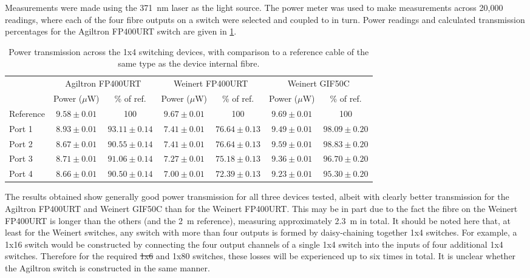 \documentclass[a4paper,11pt]{article}
\providecommand{\DIFaddtex}[1]{{\protect\color{blue}\uwave{#1}}} %
\providecommand{\DIFdeltex}[1]{{\protect\color{red}\sout{#1}}}                      %
\providecommand{\DIFaddbegin}{} %
\providecommand{\DIFaddend}{} %
\providecommand{\DIFdelbegin}{} %
\providecommand{\DIFdelend}{} %
\providecommand{\DIFadd}[1]{\texorpdfstring{\DIFaddtex{#1}}{#1}} %
\providecommand{\DIFdel}[1]{\texorpdfstring{\DIFdeltex{#1}}{}} %
\newcommand{\DIFscaledelfig}{0.5}
\newlength{\DIFdelgraphicswidth} %
\newlength{\DIFdelgraphicsheight} %
\newcommand{\DIFaddincludegraphics}[2][]{{\color{blue}\fbox{\DIFOincludegraphics[#1]{#2}}}} %
\newcommand{\DIFdelincludegraphics}[2][]{%
\sbox{\DIFdelgraphicsbox}{\DIFOincludegraphics[#1]{#2}}%
\settoboxwidth{\DIFdelgraphicswidth}{\DIFdelgraphicsbox} %
\settoboxtotalheight{\DIFdelgraphicsheight}{\DIFdelgraphicsbox} %
\scalebox{\DIFscaledelfig}{%
\parbox[b]{\DIFdelgraphicswidth}{\usebox{\DIFdelgraphicsbox}\\[-\baselineskip] \rule{\DIFdelgraphicswidth}{0em}}\llap{\resizebox{\DIFdelgraphicswidth}{\DIFdelgraphicsheight}{%
\setlength{\unitlength}{\DIFdelgraphicswidth}%
\begin{picture}(1,1)%
\thicklines\linethickness{2pt} %
{\color[rgb]{1,0,0}\put(0,0){\framebox(1,1){}}}%
{\color[rgb]{1,0,0}\put(0,0){\line( 1,1){1}}}%
{\color[rgb]{1,0,0}\put(0,1){\line(1,-1){1}}}%
\end{picture}%
}\hspace*{3pt}}} %
} %
\DeclareRobustCommand{\DIFaddbegin}{\DIFOaddbegin \let\includegraphics\DIFaddincludegraphics} %
\DeclareRobustCommand{\DIFaddend}{\DIFOaddend \let\includegraphics\DIFOincludegraphics} %
\DeclareRobustCommand{\DIFdelbegin}{\DIFOdelbegin \let\includegraphics\DIFdelincludegraphics} %
\DeclareRobustCommand{\DIFdelend}{\DIFOaddend \let\includegraphics\DIFOincludegraphics} %
\begin{document}
Measurements were made using the 371~nm laser as the light source. The power meter was used to make measurements across 20,000 readings, where each of the four fibre outputs on a switch were selected and coupled to in turn. Power readings and calculated transmission percentages for the Agiltron FP400URT switch are given in \cref{tab:switchpower}.
\begin{table}[h]
\centering
\begin{tabular}{l|cc|cc|cc}
\toprule
\multirow{2}{*}{} & \multicolumn{2}{c|}{Agiltron FP400URT} & \multicolumn{2}{c|}{Weinert FP400URT} & \multicolumn{2}{c}{Weinert GIF50C} \\
			&	Power ($\mu$W) & \% of ref. & Power ($\mu$W) & \% of ref. & Power ($\mu$W) & \% of ref.\\ \midrule
Reference	& $9.58\pm0.01$	& 100  			 & $9.67\pm0.01$ & 100 			  & $9.69\pm0.01$ & 100 \\
Port 1		& $8.93\pm0.01$	& $93.11\pm0.14$ & $7.41\pm0.01$ & $76.64\pm0.13$ & $9.49\pm0.01$ & $98.09\pm0.20$ \\
Port 2		& $8.67\pm0.01$	& $90.55\pm0.14$ & $7.41\pm0.01$ & $76.64\pm0.13$ & $9.59\pm0.01$ & $98.83\pm0.20$ \\
Port 3		& $8.71\pm0.01$	& $91.06\pm0.14$ & $7.27\pm0.01$ & $75.18\pm0.13$ & $9.36\pm0.01$ & $96.70\pm0.20$ \\
Port 4		& $8.66\pm0.01$	& $90.50\pm0.14$ & $7.00\pm0.01$ & $72.39\pm0.13$ & $9.23\pm0.01$ & $95.30\pm0.20$ \\
\bottomrule
\end{tabular}
\caption{Power transmission across the 1x4 switching devices, with comparison to a reference cable of the same type as the device internal fibre.}\label{tab:switchpower}
\end{table}
The results obtained show generally good power transmission for all three devices tested, albeit with clearly better transmission for the Agiltron FP400URT and Weinert GIF50C than for the Weinert FP400URT. This may be in part due to the fact the fibre on the Weinert FP400URT is longer than the others (and the 2~m reference), measuring approximately 2.3~m in total. It should be noted here that, at least for the Weinert switches, any switch with more than four outputs is formed by daisy-chaining together 1x4 switches. For example, a 1x16 switch would be constructed by connecting \DIFaddbegin \DIFadd{each of }\DIFaddend the four output channels of a single 1x4 switch into the inputs of four additional 1x4 switches. Therefore for the required \DIFdelbegin \DIFdel{1x6 }\DIFdelend \DIFaddbegin \DIFadd{1x8 }\DIFaddend and 1x80 switches, these losses will be experienced up to six times in total. It is unclear whether the Agiltron switch is constructed in the same manner.
\end{document}
